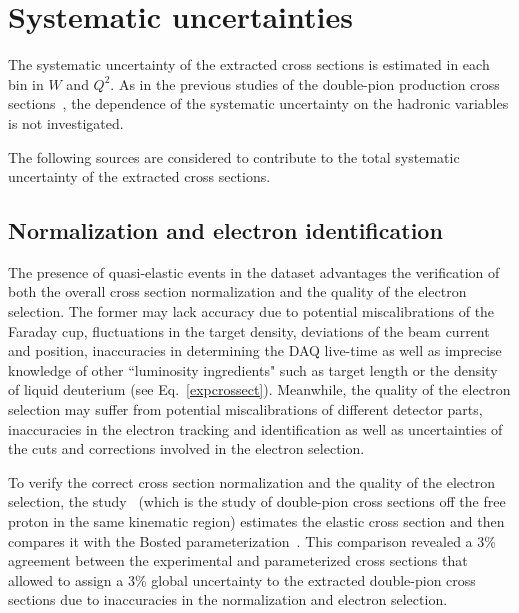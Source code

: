  





\section{Systematic uncertainties}
\label{Sect:sys_uncert}

The systematic uncertainty of the extracted cross sections is estimated in each bin in $W$ and $Q^{2}$. As in the previous studies of the double-pion production cross sections~\cite{Rip_an_note:2002,Ripani:2002ss,Fed_an_note:2007,Fedotov:2008aa,Isupov:2017lnd,Arjun,Fed_an_note:2017,Fed_paper_2018}, the dependence of the systematic uncertainty on the hadronic variables is not investigated. 


The following sources are considered to contribute to the total systematic uncertainty of the extracted cross sections.



\subsection*{Normalization and electron identification}

The presence of quasi-elastic events in the dataset advantages the verification of both the overall cross section normalization and the quality of the electron selection. The former may lack accuracy due to potential miscalibrations of the Faraday cup, fluctuations in the target density, deviations of the beam current and position, inaccuracies in determining the DAQ live-time as well as imprecise knowledge of other ``luminosity ingredients" such as target length or the density of liquid deuterium (see Eq.~\eqref{expcrossect}). Meanwhile, the quality of the electron selection may suffer from potential miscalibrations of different detector parts, inaccuracies in the electron tracking and identification as well as uncertainties of the cuts and corrections involved in the electron selection.

To verify the correct cross section normalization and the quality of the electron selection, the study~\cite{Fed_an_note:2017,Fed_paper_2018} (which is the study of double-pion cross sections off the free proton in the same kinematic region) estimates the elastic cross section and then compares it with the Bosted parameterization~\cite{Bosted:1994tm}. This comparison revealed a 3\% agreement between the experimental and parameterized cross sections that allowed to assign a 3\% global uncertainty to the extracted double-pion cross sections due to inaccuracies in the normalization and electron selection.

